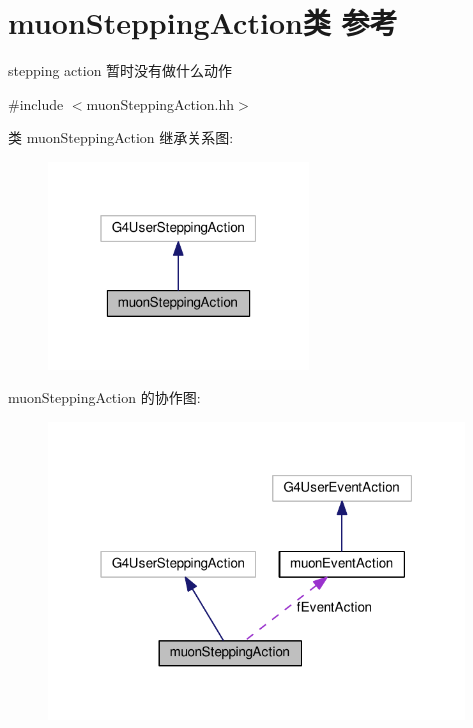 \hypertarget{classmuonSteppingAction}{}\section{muon\+Stepping\+Action类 参考}
\label{classmuonSteppingAction}


stepping action 暂时没有做什么动作  




{\ttfamily \#include $<$muon\+Stepping\+Action.\+hh$>$}



类 muon\+Stepping\+Action 继承关系图\+:\nopagebreak
\begin{figure}[H]
\begin{center}
\leavevmode
\includegraphics[width=196pt]{classmuonSteppingAction__inherit__graph}
\end{center}
\end{figure}


muon\+Stepping\+Action 的协作图\+:\nopagebreak
\begin{figure}[H]
\begin{center}
\leavevmode
\includegraphics[width=313pt]{classmuonSteppingAction__coll__graph}
\end{center}
\end{figure}

